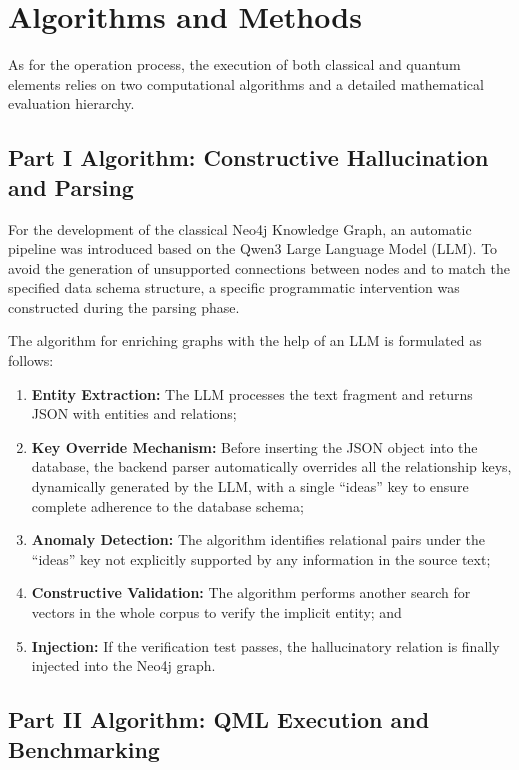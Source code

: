 \section{Algorithms and Methods}

As for the operation process, the execution of both classical and quantum elements relies on two computational algorithms and a detailed mathematical evaluation hierarchy.

\subsection{Part I Algorithm: Constructive Hallucination and Parsing}

For the development of the classical Neo4j Knowledge Graph, an automatic pipeline was introduced based on the Qwen3 Large Language Model (LLM). To avoid the generation of unsupported connections between nodes and to match the specified data schema structure, a specific programmatic intervention was constructed during the parsing phase.

The algorithm for enriching graphs with the help of an LLM is formulated as follows:
\begin{enumerate}
	\item \textbf{Entity Extraction:} The LLM processes the text fragment and returns JSON with entities and relations;
	\item \textbf{Key Override Mechanism:} Before inserting the JSON object into the database, the backend parser automatically overrides all the relationship keys, dynamically generated by the LLM, with a single “ideas” key to ensure complete adherence to the database schema;
	\item \textbf{Anomaly Detection:} The algorithm identifies relational pairs under the “ideas” key not explicitly supported by any information in the source text;
	\item \textbf{Constructive Validation:} The algorithm performs another search for vectors in the whole corpus to verify the implicit entity; and
	\item \textbf{Injection:} If the verification test passes, the hallucinatory relation is finally injected into the Neo4j graph.
\end{enumerate}

\subsection{Part II Algorithm: QML Execution and Benchmarking}

